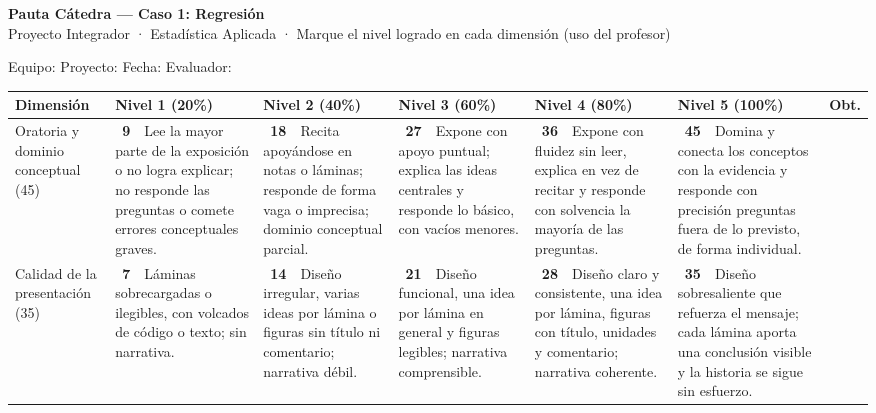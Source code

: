 \documentclass[11pt,letterpaper]{article}
\newcommand{\chk}{\framebox[0.42cm]{\rule{0pt}{0.30cm}}}
\begin{document}
\begin{center}
{\large \textbf{Pauta Cátedra --- Caso 1: Regresión}}\\[0.1cm]
{\footnotesize Proyecto Integrador · Estadística Aplicada · Marque el nivel logrado en cada dimensión (uso del profesor)}
\end{center}
\vspace{0.05cm}
{\small Equipo: \underline{\hspace{5cm}}\quad Proyecto: \underline{\hspace{5.5cm}}\quad Fecha: \underline{\hspace{2.6cm}}\quad Evaluador: \underline{\hspace{3.5cm}}}
\vspace{0.15cm}

\footnotesize\renewcommand{\arraystretch}{1.15}
\begin{tabular}{p{2.4cm} p{3.15cm} p{3.15cm} p{3.15cm} p{3.15cm} p{3.15cm} p{1.2cm}}
\toprule
Dimensión & Nivel 1 (20\%) & Nivel 2 (40\%) & Nivel 3 (60\%) & Nivel 4 (80\%) & Nivel 5 (100\%) & Obt. \\
\midrule
Oratoria y dominio conceptual (45) & \chk\ \textbf{9}~~Lee la mayor parte de la exposición o no logra explicar; no responde las preguntas o comete errores conceptuales graves. & \chk\ \textbf{18}~~Recita apoyándose en notas o láminas; responde de forma vaga o imprecisa; dominio conceptual parcial. & \chk\ \textbf{27}~~Expone con apoyo puntual; explica las ideas centrales y responde lo básico, con vacíos menores. & \chk\ \textbf{36}~~Expone con fluidez sin leer, explica en vez de recitar y responde con solvencia la mayoría de las preguntas. & \chk\ \textbf{45}~~Domina y conecta los conceptos con la evidencia y responde con precisión preguntas fuera de lo previsto, de forma individual. & \rule{0pt}{0.7cm} \\
Calidad de la presentación (35) & \chk\ \textbf{7}~~Láminas sobrecargadas o ilegibles, con volcados de código o texto; sin narrativa. & \chk\ \textbf{14}~~Diseño irregular, varias ideas por lámina o figuras sin título ni comentario; narrativa débil. & \chk\ \textbf{21}~~Diseño funcional, una idea por lámina en general y figuras legibles; narrativa comprensible. & \chk\ \textbf{28}~~Diseño claro y consistente, una idea por lámina, figuras con título, unidades y comentario; narrativa coherente. & \chk\ \textbf{35}~~Diseño sobresaliente que refuerza el mensaje; cada lámina aporta una conclusión visible y la historia se sigue sin esfuerzo. & \rule{0pt}{0.7cm} \\

\end{tabular}
\end{document}
